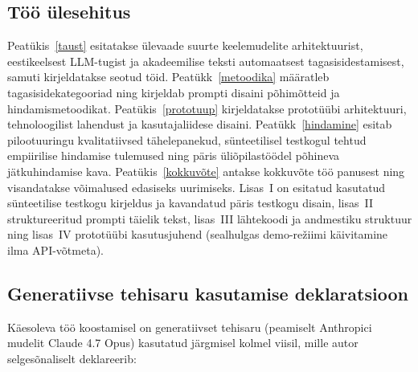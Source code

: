 \subsection*{Töö ülesehitus}

Peatükis~\ref{taust} esitatakse ülevaade suurte keelemudelite arhitektuurist, eestikeelsest LLM-tugist ja akadeemilise teksti automaatsest tagasisidestamisest, samuti kirjeldatakse seotud töid. Peatükk~\ref{metoodika} määratleb tagasisidekategooriad ning kirjeldab prompti disaini põhimõtteid ja hindamismetoodikat. Peatükis~\ref{prototuup} kirjeldatakse prototüübi arhitektuuri, tehnoloogilist lahendust ja kasutajaliidese disaini. Peatükk~\ref{hindamine} esitab pilootuuringu kvalitatiivsed tähelepanekud, sünteetilisel testkogul tehtud empiirilise hindamise tulemused ning päris üliõpilastöödel põhineva jätkuhindamise kava. Peatükis~\ref{kokkuvõte} antakse kokkuvõte töö panusest ning visandatakse võimalused edasiseks uurimiseks. Lisas~I on esitatud kasutatud sünteetilise testkogu kirjeldus ja kavandatud päris testkogu disain, lisas~II struktureeritud prompti täielik tekst, lisas~III lähtekoodi ja andmestiku struktuur ning lisas~IV prototüübi kasutusjuhend (sealhulgas demo-režiimi käivitamine ilma API-võtmeta).

\subsection*{Generatiivse tehisaru kasutamise deklaratsioon}

Käesoleva töö koostamisel on generatiivset tehisaru (peamiselt Anthropici mudelit Claude 4.7 Opus) kasutatud järgmisel kolmel viisil, mille autor selgesõnaliselt deklareerib:

